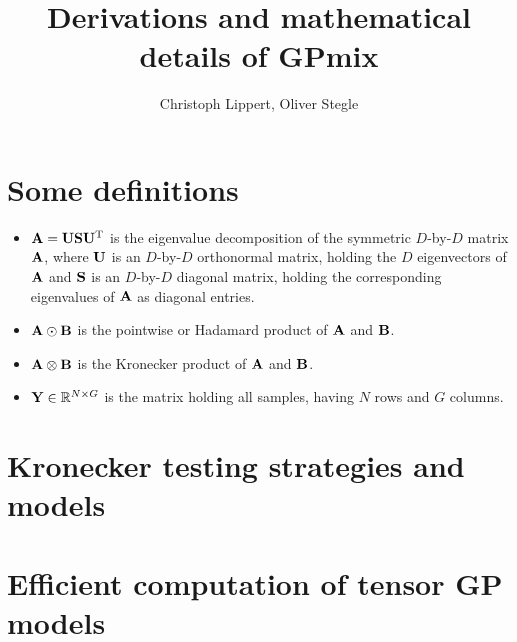 \documentclass{article}
\title{Derivations and mathematical details of GPmix}
\author[1]{Christoph Lippert, Oliver Stegle}
\affil[1]{Department Empirical Inference,
Max Planck Institutes T\"ubingen, Germany}
\date{}
\newcommand{\B}[1]{{\bf{#1}}}
\begin{document}
\maketitle


\section{Some definitions}
\begin{itemize}
\item $\B{A}=\B{U}\B{S}\B{U}^{\T}$ is the eigenvalue decomposition of
  the symmetric $D$-by-$D$ matrix $\B{A}$, where $\B{U}$ is an
  $D$-by-$D$ orthonormal matrix, holding the $D$ eigenvectors of
  $\B{A}$ and $\B{S}$ is an $D$-by-$D$ diagonal matrix, holding the
  corresponding eigenvalues of $\B{A}$ as diagonal entries. 
\item $\B{A}\odot\B{B}$ is the pointwise or Hadamard product of $\B{A}$ and $\B{B}$.
\item $\B{A}\otimes\B{B}$ is the Kronecker product of $\B{A}$ and $\B{B}$.
\item $\B{Y}\in\mathbb{R}^{N\times G}$ is the matrix holding all samples, having $N$ rows and $G$ columns.
\end{itemize}


\section{Kronecker testing strategies and models}

\section{Efficient computation of tensor GP models}


\newpage
\end{document}
